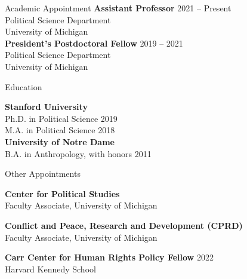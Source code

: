 \documentclass{resume} %
\begin{document}
\begin{rSection}{Academic Appointment}
{\bf Assistant Professor} \hfill {2021 -- Present}
\\ Political Science Department\\
 University of Michigan\\

{\bf President's Postdoctoral Fellow} \hfill {2019 -- 2021}
\\ Political Science Department\\
University of Michigan

\end{rSection}

\begin{rSection}{Education}

{\bf Stanford University} \\
 Ph.D. in Political Science \hfill {2019} \\
{M.A. in Political Science} \hfill 2018\\


{\bf University of Notre Dame} \\
 B.A. in Anthropology, with honors \hfill {2011}  \\


\end{rSection}
\begin{rSection}{Other Appointments}

{\bf Center for Political Studies} \\ Faculty Associate, University of Michigan

{\bf Conflict and Peace, Research and Development (CPRD)} \\ Faculty Associate, University of Michigan

{\bf Carr Center for Human Rights Policy Fellow} \hfill {2022} \\Harvard Kennedy School


\end{rSection}
\end{document}
